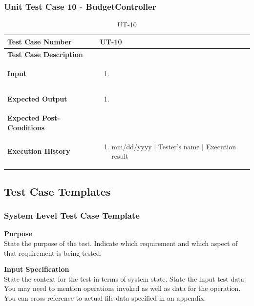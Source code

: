 \documentclass[12pt]{article}
\begin{document}
\subsubsection{Unit Test Case 10 - BudgetController}
\def\arraystretch{1.5}%
\begin{table}[htbp]
\centering
\caption{UT-10}
\label{UT-10}
\begin{tabularx}{\textwidth}{ | l | X |}
\hline
\textbf{Test Case Number}      		&  UT-10                 			\\ \hline
\textbf{Test Case Description}    	&                  				\\ \hline
\textbf{Input}         			& 	\begin{enumerate}
								\item
							\end{enumerate} 		\\ \hline
\textbf{Expected Output}     		& 	\begin{enumerate}
								\item 
							\end{enumerate} 		\\ \hline
\textbf{Expected Post-Conditions}	&                 				\\ \hline
\textbf{Execution History}   		&  	\begin{enumerate}
								\item mm/dd/yyyy | Tester's name | Execution result
							\end {enumerate} \\ \hline
\end{tabularx}
\end{table}
\clearpage

\subsection{Test Case Templates}

\subsubsection{System Level Test Case Template}
\noindent
{\bf Purpose}\\
State the purpose of the test.
Indicate which requirement and which aspect of that requirement is being tested.

\noindent
{\bf Input Specification}\\
State the context for the test in terms of system state.
State the input test data. You may need to mention operations invoked as well as data for the operation.
You can cross-reference to actual file data specified in an appendix.
\end{document}
